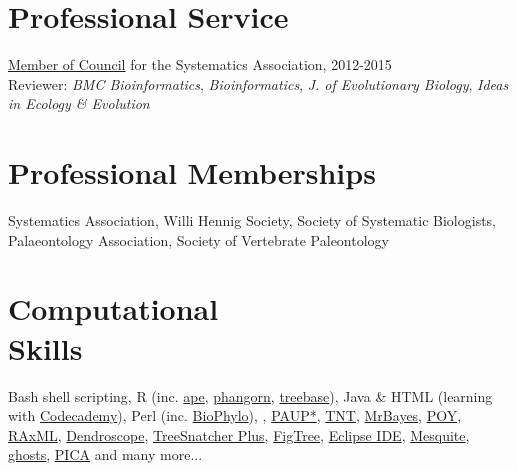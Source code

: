 \documentclass[margin,line]{resume}
\begin{document}
\begin{resume}
    \section{\mysidestyle Professional Service} 

\href{http://www.systass.org/council/2013council.shtml}{Member of Council} for the Systematics Association, 2012-2015 \\
Reviewer: \textsl{BMC Bioinformatics}, \textsl{Bioinformatics}, \textsl{J. of Evolutionary Biology}, \textsl{Ideas in Ecology \& Evolution}\\

\vspace{-7 mm} 
    \section{\mysidestyle Professional Memberships}

Systematics Association, Willi Hennig Society, Society of Systematic Biologists, \\
Palaeontology Association, Society of Vertebrate Paleontology\\

\vspace{-7 mm}  
    \section{\mysidestyle Computational \\ Skills} 

    Bash shell scripting, R (inc. \href{http://cran.r-project.org/web/packages/ape/}{ape}, \href{http://cran.r-project.org/web/packages/phangorn/}{phangorn}, \href{http://cran.r-project.org/web/packages/treebase/}{treebase}), Java \& HTML (learning with \href{http://www.codecademy.com/users/rmounce}{Codecademy}), Perl (inc. \href{http://search.cpan.org/dist/Bio-Phylo/}{BioPhylo}), \LaTeXe, \href{http://paup.csit.fsu.edu/}{PAUP*}, \href{http://www.zmuc.dk/public/phylogeny/tnt/}{TNT}, \href{http://mrbayes.sourceforge.net/}{MrBayes}, \href{http://research.amnh.org/scicomp/research/projects/invertebrate-zoology/poy?q=projects/poy.php}{POY}, \href{http://sco.h-its.org/exelixis/software.html}{RAxML}, \href{http://ab.inf.uni-tuebingen.de/software/dendroscope/}{Dendroscope}, \href{http://www.cs.uni-duesseldorf.de/AG/BI/Software/treesnatcher/}{TreeSnatcher Plus}, \href{http://tree.bio.ed.ac.uk/software/figtree/}{FigTree}, \href{http://www.eclipse.org/}{Eclipse IDE}, \href{http://mesquiteproject.org/mesquite/mesquite.html}{Mesquite}, \href{http://palaeo.gly.bris.ac.uk/cladestrat/Gho2.html}{ghosts}, \href{http://www.nhm.ac.uk/research-curation/research/projects/software/}{PICA} and many more...\\


\end{resume}
\end{document}
